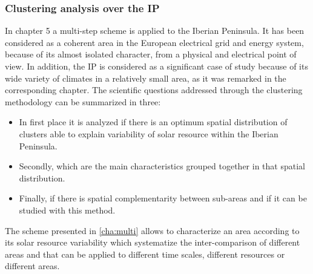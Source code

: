 

\subsubsection{Clustering analysis over the IP}

In chapter 5 a multi-step scheme is applied to the Iberian Peninsula. It has been considered as a coherent area in the European electrical grid and energy system, because of its almost isolated character, from a physical and electrical point of view. In addition, the IP is considered as a significant case of study because of its wide variety of climates in a relatively small area, as it was remarked in the corresponding chapter. The scientific questions addressed through the clustering methodology can be summarized in three:

\begin{itemize}
  
\item In first place it is analyzed if there is an optimum spatial distribution of clusters able to explain variability of solar resource within the Iberian Peninsula.

\item Secondly, which are the main characteristics grouped together in that spatial distribution.

\item Finally, if there is spatial complementarity between sub-areas and if it can be studied with this method.

\end{itemize}

The scheme presented in \ref{cha:multi} allows to characterize an area according to its solar resource variability which systematize the inter-comparison of different areas and that can be applied to different time scales, different resources or different areas.

